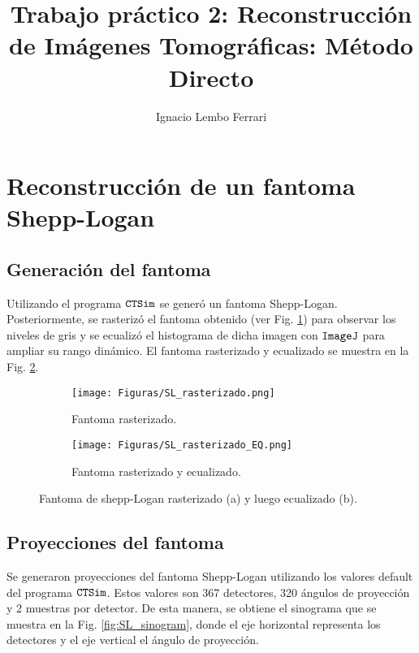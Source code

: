 \documentclass[letterpaper,12pt]{article}
\title{Trabajo práctico 2: Reconstrucción de Imágenes Tomográficas: Método Directo} %
\author[1]{Ignacio Lembo Ferrari}
\affil[1]{Instituto Balseiro}
\date{\vspace{-4ex}}
\theoremstyle{plain}
\begin{document}
\maketitle

\section{Reconstrucción de un fantoma Shepp-Logan}

\subsection{Generación del fantoma}

Utilizando el programa $\verb|CTSim|$ se generó un fantoma Shepp-Logan. Posteriormente, se rasterizó el fantoma obtenido (ver Fig. \ref{fig:SL_rast}) para observar los niveles de gris y se ecualizó el histograma de dicha imagen con $\verb|ImageJ|$ para ampliar su rango dinámico. El fantoma rasterizado y ecualizado se muestra en la Fig. \ref{fig:SL_EQ}.  

\begin{figure}[H]
   \centering
        \begin{subfigure}[h]{0.49\linewidth}
           \centering
           \texttt{[image: Figuras/SL\_rasterizado.png]}
           \caption{Fantoma rasterizado.} 
           \label{fig:SL_rast}
        \end{subfigure}
        \begin{subfigure}[h]{0.49\linewidth}
           \centering
           \texttt{[image: Figuras/SL\_rasterizado\_EQ.png]}
           \caption{Fantoma rasterizado y ecualizado.}
           \label{fig:SL_EQ}
        \end{subfigure}
   \caption{Fantoma de shepp-Logan rasterizado (a) y luego ecualizado (b).}
   \label{fig:SL}
\end{figure}

\subsection{Proyecciones del fantoma}

Se generaron proyecciones del fantoma Shepp-Logan utilizando los valores default del programa $\verb|CTSim|$. Estos valores son 367 detectores, 320 ángulos de proyección y 2 muestras por detector. De esta manera, se obtiene el sinograma que se muestra en la Fig. \ref{fig:SL_sinogram}, donde el eje horizontal representa los detectores y el eje vertical el ángulo de proyección.
\end{document}
